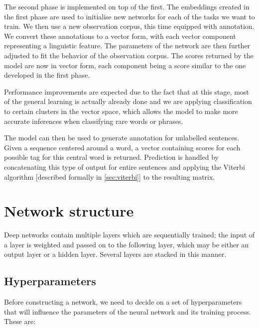 The second phase is implemented on top of the first. The embeddings
created in the first phase are used to initialise new networks for
each of the tasks we want to train. We then use a new observation
corpus, this time equipped with annotation. We convert these
annotations to a vector form, with each vector component representing
a linguistic feature. The parameters of the network are then further
adjusted to fit the behavior of the observation corpus. The scores
returned by the model are now in vector form, each component being a
score similar to the one developed in the first phase.

Performance improvements are expected due to the fact that at this
stage, most of the general learning is actually already done and we
are applying classification to certain clusters in the vector space,
which allows the model to make more accurate inferences when
classifying rare words or phrases.

The model can then be used to generate annotation for unlabelled
sentences. Given a sequence centered around a word, a vector
containing scores for each possible tag for this central word is
returned. Prediction is handled by concatenating this type of output
for entire sentences and applying the Viterbi algorithm [described
formally in \ref{sec:viterbi}] to the resulting matrix.

\section{Network structure}
\label{sec:networkstructure}

Deep networks contain multiple layers which are sequentially trained;
the input of a layer is weighted and passed on to the following layer,
which may be either an output layer or a hidden layer. Several layers
are stacked in this manner.

\subsection{Hyperparameters}

Before constructing a network, we need to decide on a set of
hyperparameters that will influence the parameters of the neural
network and its training process. These are:

